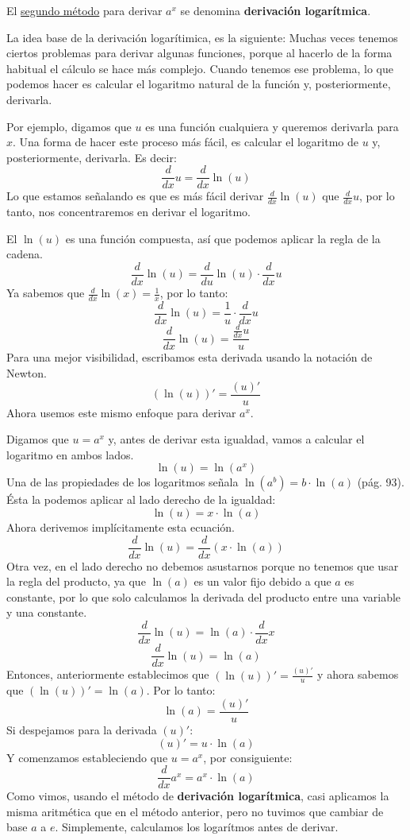 \documentclass[12pt]{article}
\begin{document}
El \underline{segundo método} para derivar $a^{x}$ se denomina \textbf{derivación logarítmica}.

La idea base de la derivación logarítimica, es la siguiente: Muchas veces tenemos ciertos problemas para derivar algunas funciones, porque al hacerlo de la forma habitual el cálculo se hace más complejo. Cuando tenemos ese problema, lo que podemos hacer es calcular el logaritmo natural de la función y, posteriormente, derivarla.

Por ejemplo, digamos que $u$ es una función cualquiera y queremos derivarla para $x$. Una forma de hacer este proceso más fácil, es calcular el logaritmo de $u$ y, posteriormente, derivarla. Es decir:
\[\frac{d}{dx} u = \frac{d}{dx} \ln(u)\]
Lo que estamos señalando es que es más fácil derivar $\frac{d}{dx} \ln(u)$ que $\frac{d}{dx} u$, por lo tanto, nos concentraremos en derivar el logaritmo.

El $\ln(u)$ es una función compuesta, así que podemos aplicar la regla de la cadena.
\[\frac{d}{dx} \ln(u) = \frac{d}{du} \ln(u) \cdot \frac{d}{dx} u\]
Ya sabemos que $\frac{d}{dx} \ln(x) = \frac{1}{x}$, por lo tanto:
\[\frac{d}{dx} \ln(u) = \frac{1}{u} \cdot \frac{d}{dx} u\]
\[\frac{d}{dx} \ln(u) = \frac{\frac{d}{dx} u}{u}\]
Para una mejor visibilidad, escribamos esta derivada usando la notación de Newton.
\[(\ln(u))' = \frac{(u)'}{u}\]
Ahora usemos este mismo enfoque para derivar $a^{x}$. 

Digamos que $u = a ^{x}$ y, antes de derivar esta igualdad, vamos a calcular el logaritmo en ambos lados.
\[\ln(u) = \ln(a^{x})\]
Una de las propiedades de los logaritmos señala $\ln(a^{b}) = b \cdot \ln(a)$ (pág. 93). Ésta la podemos aplicar al lado derecho de la igualdad:
\[\ln(u) = x \cdot \ln(a)\]
Ahora derivemos implícitamente esta ecuación.
\[\frac{d}{dx} \ln(u) = \frac{d}{dx} (x \cdot \ln(a))\]
Otra vez, en el lado derecho no debemos asustarnos porque no tenemos que usar la regla del producto, ya que $\ln(a)$ es un valor fijo debido a que $a$ es constante, por lo que solo calculamos la derivada del producto entre una variable y una constante.
\[\frac{d}{dx} \ln(u) = \ln(a) \cdot \frac{d}{dx} x\]
\[\frac{d}{dx} \ln(u) = \ln(a)\]
Entonces, anteriormente establecimos que $(\ln(u))' = \frac{(u)'}{u}$ y ahora sabemos que $(\ln(u))' = \ln(a)$. Por lo tanto:
\[\ln(a) = \frac{(u)'}{u}\]
Si despejamos para la derivada $(u)'$:
\[(u)' = u \cdot \ln(a)\]
Y comenzamos estableciendo que $u = a ^{x}$, por consiguiente:
\[\frac{d}{dx} a^{x} = a^{x} \cdot \ln(a)\]
Como vimos, usando el método de \textbf{derivación logarítmica}, casi aplicamos la misma aritmética que en el método anterior, pero no tuvimos que cambiar de base $a$ a $e$. Simplemente, calculamos los logarítmos antes de derivar.
\end{document}
